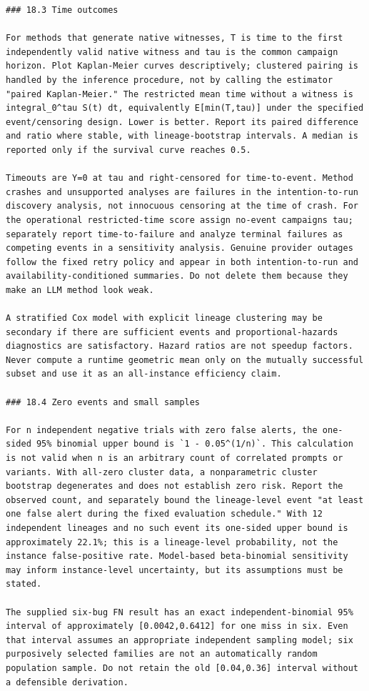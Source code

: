 \documentclass[11pt,a4paper]{article}
\begin{document}
\begin{verbatim}
### 18.3 Time outcomes

For methods that generate native witnesses, T is time to the first independently valid native witness and tau is the common campaign horizon. Plot Kaplan-Meier curves descriptively; clustered pairing is handled by the inference procedure, not by calling the estimator "paired Kaplan-Meier." The restricted mean time without a witness is integral_0^tau S(t) dt, equivalently E[min(T,tau)] under the specified event/censoring design. Lower is better. Report its paired difference and ratio where stable, with lineage-bootstrap intervals. A median is reported only if the survival curve reaches 0.5.

Timeouts are Y=0 at tau and right-censored for time-to-event. Method crashes and unsupported analyses are failures in the intention-to-run discovery analysis, not innocuous censoring at the time of crash. For the operational restricted-time score assign no-event campaigns tau; separately report time-to-failure and analyze terminal failures as competing events in a sensitivity analysis. Genuine provider outages follow the fixed retry policy and appear in both intention-to-run and availability-conditioned summaries. Do not delete them because they make an LLM method look weak.

A stratified Cox model with explicit lineage clustering may be secondary if there are sufficient events and proportional-hazards diagnostics are satisfactory. Hazard ratios are not speedup factors. Never compute a runtime geometric mean only on the mutually successful subset and use it as an all-instance efficiency claim.

### 18.4 Zero events and small samples

For n independent negative trials with zero false alerts, the one-sided 95% binomial upper bound is `1 - 0.05^(1/n)`. This calculation is not valid when n is an arbitrary count of correlated prompts or variants. With all-zero cluster data, a nonparametric cluster bootstrap degenerates and does not establish zero risk. Report the observed count, and separately bound the lineage-level event "at least one false alert during the fixed evaluation schedule." With 12 independent lineages and no such event its one-sided upper bound is approximately 22.1%; this is a lineage-level probability, not the instance false-positive rate. Model-based beta-binomial sensitivity may inform instance-level uncertainty, but its assumptions must be stated.

The supplied six-bug FN result has an exact independent-binomial 95% interval of approximately [0.0042,0.6412] for one miss in six. Even that interval assumes an appropriate independent sampling model; six purposively selected families are not an automatically random population sample. Do not retain the old [0.04,0.36] interval without a defensible derivation.


\end{verbatim}
\end{document}
